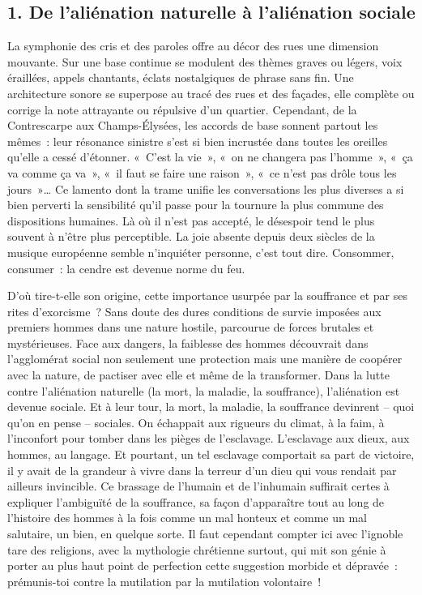 \documentclass[french,twoside]{book} %
\begin{document}
\subsection[{1. De l’aliénation naturelle à l’aliénation sociale}]{\textsc{1.} De l’aliénation naturelle à l’aliénation sociale}
\noindent La symphonie des cris et des paroles offre au décor des rues une dimension mouvante. Sur une base continue se modulent des thèmes graves ou légers, voix éraillées, appels chantants, éclats nostalgiques de phrase sans fin. Une architecture sonore se superpose au tracé des rues et des façades, elle complète ou corrige la note attrayante ou répulsive d’un quartier. Cependant, de la Contrescarpe aux Champs-Élysées, les accords de base sonnent partout les mêmes : leur résonance sinistre s’est si bien incrustée dans toutes les oreilles qu’elle a cessé d’étonner. « C’est la vie », « on ne changera pas l’homme », « ça va comme ça va », « il faut se faire une raison », « ce n’est pas drôle tous les jours »… Ce lamento dont la trame unifie les conversations les plus diverses a si bien perverti la sensibilité qu’il passe pour la tournure la plus commune des dispositions humaines. Là où il n’est pas accepté, le désespoir tend le plus souvent à n’être plus perceptible. La joie absente depuis deux siècles de la musique européenne semble n’inquiéter personne, c’est tout dire. Consommer, consumer : la cendre est devenue norme du feu.\par
D’où tire-t-elle son origine, cette importance usurpée par la souffrance et par ses rites d’exorcisme ? Sans doute des dures conditions de survie imposées aux premiers hommes dans une nature hostile, parcourue de forces brutales et mystérieuses. Face aux dangers, la faiblesse des hommes découvrait dans l’agglomérat social non seulement une protection mais une manière de coopérer avec la nature, de pactiser avec elle et même de la transformer. Dans la lutte contre l’aliénation naturelle (la mort, la maladie, la souffrance), l’aliénation est devenue sociale. Et à leur tour, la mort, la maladie, la souffrance devinrent – quoi qu’on en pense – sociales. On échappait aux rigueurs du climat, à la faim, à l’inconfort pour tomber dans les pièges de l’esclavage. L’esclavage aux dieux, aux hommes, au langage. Et pourtant, un tel esclavage comportait sa part de victoire, il y avait de la grandeur à vivre dans la terreur d’un dieu qui vous rendait par ailleurs invincible. Ce brassage de l’humain et de l’inhumain suffirait certes à expliquer l’ambiguïté de la souffrance, sa façon d’apparaître tout au long de l’histoire des hommes à la fois comme un mal honteux et comme un mal salutaire, un bien, en quelque sorte. Il faut cependant compter ici avec l’ignoble tare des religions, avec la mythologie chrétienne surtout, qui mit son génie à porter au plus haut point de perfection cette suggestion morbide et dépravée : prémunis-toi contre la mutilation par la mutilation volontaire !\par
\end{document}
